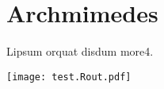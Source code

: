 \documentclass[12pt]{article}
\begin{document}
\section{Archmimedes}

Lipsum orquat disdum more4.

\texttt{[image: test.Rout.pdf]}
\end{document}
